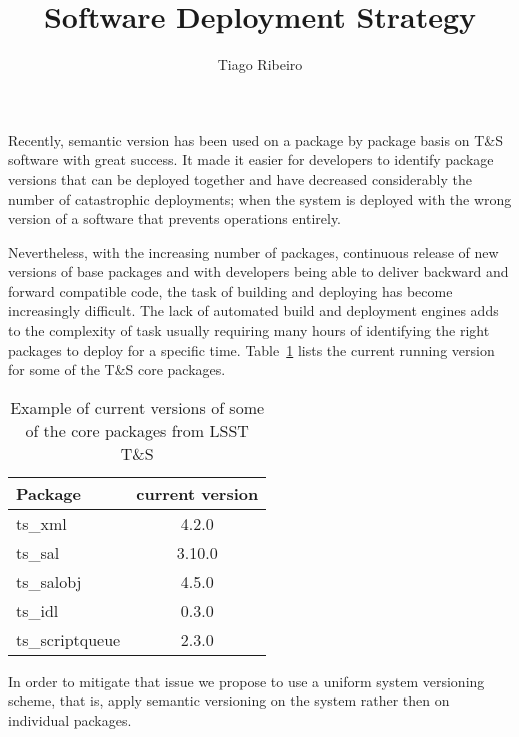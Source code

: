 \documentclass[TS,authoryear,toc]{lsstdoc}
\title{Software Deployment Strategy}
\author{%
Tiago Ribeiro
}
\date{\vcsDate}
\begin{document}
\maketitle


Recently, semantic version has been used on a package by package basis on T\&S software 
with great success. It made it easier for developers to identify package versions that can be
deployed together and have decreased considerably the number of catastrophic deployments;
when the system is deployed with the wrong version of a software that prevents operations entirely. 

Nevertheless, with the increasing number of packages, continuous release of new versions of base 
packages and with developers being able to deliver backward and forward compatible code, the task 
of building and deploying has become increasingly difficult. The lack of automated build and 
deployment engines adds to the complexity of task usually requiring many hours of identifying the right
packages to deploy for a specific time. Table~\ref{tab:package_version} lists the current running version 
for some of the T\&S core packages.

\begin{table}[htb]
\caption{Example of current versions of some of the core packages from
LSST T\&S}
\begin{center}
  \begin{tabular}{ l | c }
Package & current version \\
    \hline
ts\_xml & 4.2.0 \\
ts\_sal & 3.10.0 \\
ts\_salobj & 4.5.0 \\
ts\_idl & 0.3.0 \\
ts\_scriptqueue & 2.3.0 \\    
    \hline
  \end{tabular}
\end{center}
\label{tab:package_version}
\end{table}%

In order to mitigate that issue we propose to use a uniform system versioning scheme, that is, apply 
semantic versioning on the system rather then on individual packages. 
\end{document}

